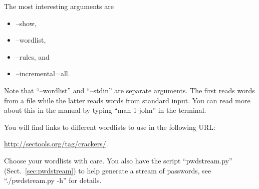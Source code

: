 The most interesting arguments are
\begin{itemize}
  \item --show,
  \item --wordlist,
  \item --rules, and
  \item --incremental=all.
\end{itemize}
Note that \enquote{--wordlist} and \enquote{--stdin} are separate arguments.
The first reads words from a file while the latter reads words from standard 
input.
You can read more about this in the manual by typing \enquote{man 1 john} in 
the terminal.

You will find links to different wordlists to use in the following URL\@:
\begin{center}
  \url{http://sectools.org/tag/crackers/}.
\end{center}
Choose your wordlists with care.
You also have the script \enquote{pwdstream.py} (Sect.~\ref{sec:pwdstream}) to 
help generate a stream of passwords, see \enquote{./pwdstream.py -h} for 
details.



